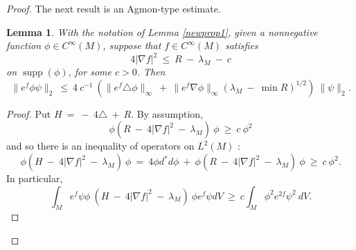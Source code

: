 \documentclass[12pt]{amsart}
\newcommand{\supp}{\operatorname{supp}}
\numberwithin{equation}{section}
\theoremstyle{plain}
\newtheorem{lemma}[equation]{Lemma}
\theoremstyle{definition}
\theoremstyle{remark}
\begin{document}
\begin{proof}
The next result is an Agmon-type estimate. 

\begin{lemma} \label{newprop2}
With the notation of Lemma \ref{newprop1}, 
given a nonnegative function $\phi \in C^\infty(M)$,
suppose that $f \in C^\infty(M)$ satisfies
\begin{equation}
4 |\nabla f|^2 \: \le \: R \: - \: \lambda_M \: - \: c
\end{equation}
on $\supp(\phi)$, for some $c > 0$. Then
\begin{equation} \label{eig3}
\|e^f \phi \psi\|_2 \: \le \: 4 \: c^{-1} \: \left( \|e^f \triangle \phi\|_\infty
\: + \: \|e^f \nabla \phi\|_\infty (\lambda_M \: - \: \min R)^{1/2} \right)
\: \|\psi\|_2.
\end{equation}
\end{lemma}
\begin{proof}
Put $H \: = \: - \: 4 \triangle \: + \: R$. 
By assumption, 
\begin{equation}
\phi (R \: - \: 4 |\nabla f|^2 \: - \: \lambda_M) \: \phi \: \ge \: c \: \phi^2
\end{equation}
and so there is an
 inequality of operators on $L^2(M)$ :
\begin{equation}
\phi (H \: - \: 4 |\nabla f|^2 \: - \: \lambda_M) \: \phi \: = \:
4 \phi d^* d \phi \: + \: 
\phi (R \: - \: 4 |\nabla f|^2 \: - \: \lambda_M) \: \phi \:
\ge \: c \: \phi^2.
\end{equation}
In particular,
\begin{equation} \label{part1}
\int_M e^f \psi\phi \: (H \: - \: 4 |\nabla f|^2 \: - \: \lambda_M) \: \phi
e^f \psi dV \: \ge \: c \int_M \phi^2 e^{2f} \psi^2 \: dV.
\end{equation}


\end{proof}
\end{proof}
\end{document}
